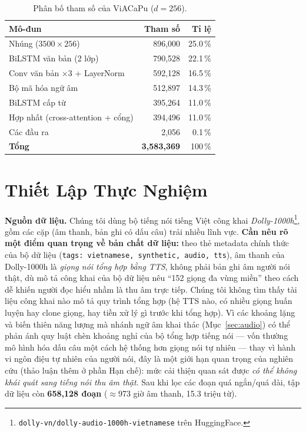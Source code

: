 \documentclass[conference,onecolumn]{IEEEtran}
\begin{document}
\begin{table}[htbp]
\caption{Phân bố tham số của ViACaPu ($d=256$).}
\label{tab:params}
\centering
\begin{tabular}{lrr}
\toprule
Mô-đun & Tham số & Tỉ lệ \\
\midrule
Nhúng ($3500\times256$)          & 896{,}000  & 25.0\,\% \\
BiLSTM văn bản (2 lớp)           & 790{,}528  & 22.1\,\% \\
Conv văn bản $\times3$ + LayerNorm & 592{,}128 & 16.5\,\% \\
Bộ mã hóa ngữ âm                 & 512{,}897  & 14.3\,\% \\
BiLSTM cấp từ                    & 395{,}264  & 11.0\,\% \\
Hợp nhất (cross-attention + cổng) & 394{,}496 & 11.0\,\% \\
Các đầu ra                       & 2{,}056    & \phantom{0}0.1\,\% \\
\midrule
\textbf{Tổng}                    & \textbf{3{,}583{,}369} & 100\,\% \\
\bottomrule
\end{tabular}
\end{table}

\section{Thiết Lập Thực Nghiệm}

\textbf{Nguồn dữ liệu.} Chúng tôi dùng bộ tiếng nói tiếng Việt công khai
\emph{Dolly-1000h}\footnote{\texttt{dolly-vn/dolly-audio-1000h-vietnamese} trên
HuggingFace.}, gồm các cặp (âm thanh, bản ghi có dấu câu) trải nhiều lĩnh vực.
\textbf{Cần nêu rõ một điểm quan trọng về bản chất dữ liệu:} theo thẻ metadata
chính thức của bộ dữ liệu (\texttt{tags: vietnamese, synthetic, audio, tts}),
âm thanh của Dolly-1000h là \emph{giọng nói tổng hợp bằng TTS}, không phải bản
ghi âm người nói thật, dù mô tả công khai của bộ dữ liệu nêu ``152 giọng đa
vùng miền'' theo cách dễ khiến người đọc hiểu nhầm là thu âm trực tiếp. Chúng
tôi không tìm thấy tài liệu công khai nào mô tả quy trình tổng hợp (hệ TTS nào,
có nhiều giọng huấn luyện hay clone giọng, hay tiền xử lý gì trước khi tổng
hợp). Vì các khoảng lặng và biến thiên năng lượng mà nhánh ngữ âm khai thác
(Mục~\ref{sec:audio}) có thể phản ánh quy luật chèn khoảng nghỉ của bộ tổng hợp
tiếng nói --- vốn thường mô hình hóa dấu câu một cách hệ thống hơn giọng nói tự
nhiên --- thay vì hành vi ngôn điệu tự nhiên của người nói, đây là một giới hạn
quan trọng của nghiên cứu (thảo luận thêm ở phần Hạn chế): mức cải thiện quan
sát được \emph{có thể không khái quát sang tiếng nói thu âm thật}. Sau khi lọc
các đoạn quá ngắn/quá dài, tập dữ liệu còn \textbf{658{,}128 đoạn} ($\approx$973
giờ âm thanh, 15.3 triệu từ).
\end{document}
